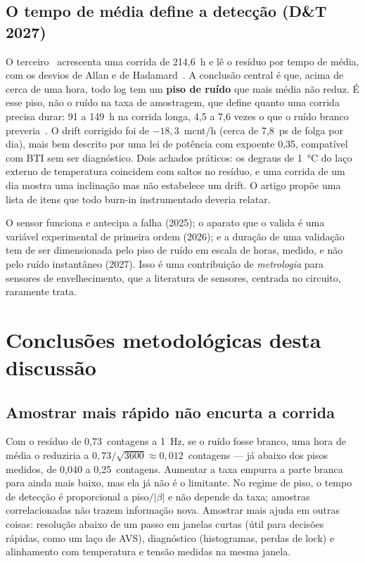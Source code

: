 \documentclass[11pt,a4paper]{article}
\begin{document}
\subsection{O tempo de média define a detecção (D\&T 2027)}

O terceiro~\cite{alencar2027dt} acrescenta uma corrida de 214,6~h e lê o resíduo por tempo de média, com os desvios de
Allan e de Hadamard~\cite{allan1966statistics}. A conclusão central é que, acima de cerca de uma hora, todo log tem um
\textbf{piso de ruído} que mais média não reduz. É esse piso, não o ruído na taxa de amostragem, que define quanto uma
corrida precisa durar: 91 a 149~h na corrida longa, 4,5 a 7,6 vezes o que o ruído branco
preveria~\cite{weatherhead1998trends}. O drift corrigido foi de $-18{,}3$~mcnt/h (cerca de 7,8~ps de folga por dia),
mais bem descrito por uma lei de potência com expoente 0,35, compatível com BTI sem ser diagnóstico. Dois achados
práticos: os degraus de 1~°C do laço externo de temperatura coincidem com saltos no resíduo, e uma corrida de um dia
mostra uma inclinação mas não estabelece um drift. O artigo propõe uma lista de itens que todo burn-in instrumentado
deveria relatar.

\begin{nota}
O sensor funciona e antecipa a falha (2025); o aparato que o valida é uma variável experimental de primeira ordem (2026);
e a duração de uma validação tem de ser dimensionada pelo piso de ruído em escala de horas, medido, e não pelo ruído
instantâneo (2027). Isso é uma contribuição de \emph{metrologia} para sensores de envelhecimento, que a literatura de
sensores, centrada no circuito, raramente trata.
\end{nota}

\section{Conclusões metodológicas desta discussão}

\subsection{Amostrar mais rápido não encurta a corrida}

Com o resíduo de 0,73~contagens a 1~Hz, se o ruído fosse branco, uma hora de média o reduziria a
$0{,}73/\sqrt{3600}\approx 0{,}012$~contagens --- já abaixo dos pisos medidos, de 0,040 a 0,25~contagens. Aumentar a taxa
empurra a parte branca para ainda mais baixo, mas ela já não é o limitante. No regime de piso, o tempo de detecção é
proporcional a piso$/|\beta|$ e não depende da taxa; amostras correlacionadas não trazem informação nova. Amostrar mais
ajuda em outras coisas: resolução abaixo de um passo em janelas curtas (útil para decisões rápidas, como um laço de AVS),
diagnóstico (histogramas, perdas de lock) e alinhamento com temperatura e tensão medidas na mesma janela.
\end{document}
